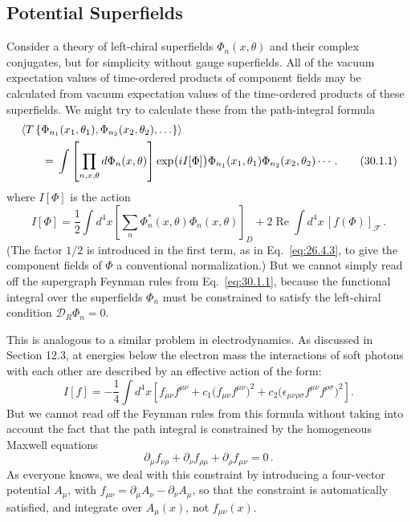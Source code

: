 
\providecommand{\SuperD}{\mathcal{D}}

\subsection{Potential Superfields}

Consider a theory of left-chiral superfields \(\Phi_n(x,\theta)\) and their
complex conjugates, but for simplicity without gauge superfields. All of the
vacuum expectation values of time-ordered products of component fields may be
calculated from vacuum expectation values of the time-ordered products of
these superfields. We might try to calculate these from the path-integral
formula
\begin{align}
  &\left\langle
    T\left\{\Phi_{n_1}(x_1,\theta_1),
      \Phi_{n_2}(x_2,\theta_2),\ldots\right\}
   \right\rangle \notag\\
  &\qquad={}
  \int\left[\prod_{n,x,\theta}d\Phi_n(x,\theta)\right]
    \exp\bigl(iI[\Phi]\bigr)
    \Phi_{n_1}(x_1,\theta_1)\Phi_{n_2}(x_2,\theta_2)\cdots\,.
  \tag{30.1.1}\label{eq:30.1.1}
\end{align}
where \(I[\Phi]\) is the action
\begin{equation}
  I[\Phi]
  =\frac12\int d^4x
    \left[\sum_n\Phi_n^*(x,\theta)\Phi_n(x,\theta)\right]_D
   +2\operatorname{Re}\int d^4x\,[f(\Phi)]_{\mathcal{F}}\,.
  \tag{30.1.2}\label{eq:30.1.2}
\end{equation}
(The factor \(1/2\) is introduced in the first term, as in
Eq.~\eqref{eq:26.4.3}, to give the component fields of \(\Phi\) a conventional
normalization.) But we cannot simply read off the supergraph Feynman rules
from Eq.~\eqref{eq:30.1.1}, because the functional integral over the
superfields \(\Phi_n\) must be constrained to satisfy the left-chiral
condition \(\SuperD_R\Phi_n=0\).

This is analogous to a similar problem in electrodynamics. As discussed in
Section 12.3, at energies below the electron mass the interactions of soft
photons with each other are described by an effective action of the form:
\[
  I[f]
  =-\frac14\int d^4x\left[
    f_{\mu\nu}f^{\mu\nu}
    +c_1\bigl(f_{\mu\nu}f^{\mu\nu}\bigr)^2
    +c_2\bigl(\epsilon_{\mu\nu\rho\sigma}
       f^{\mu\nu}f^{\rho\sigma}\bigr)^2
  \right].
\]
But we cannot read off the Feynman rules from this formula without taking
into account the fact that the path integral is constrained by the
homogeneous Maxwell equations
\[
  \partial_\mu f_{\nu\rho}
  +\partial_\nu f_{\rho\mu}
  +\partial_\rho f_{\mu\nu}=0\,.
\]
As everyone knows, we deal with this constraint by introducing a four-vector
potential \(A_\mu\), with
\(f_{\mu\nu}=\partial_\mu A_\nu-\partial_\nu A_\mu\), so that the constraint
is automatically satisfied, and integrate over \(A_\mu(x)\), not
\(f_{\mu\nu}(x)\).


